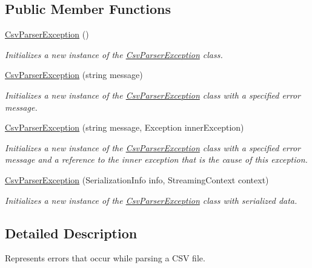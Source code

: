 \subsection*{Public Member Functions}
\begin{DoxyCompactItemize}
\item 
\hyperlink{a00047_a4a87a8cbca18790562bab5f571e6e87b}{Csv\-Parser\-Exception} ()
\begin{DoxyCompactList}\small\item\em Initializes a new instance of the \hyperlink{a00047}{Csv\-Parser\-Exception} class. \end{DoxyCompactList}\item 
\hyperlink{a00047_a6ac692a1b7bb39afc66a7c701963e9c2}{Csv\-Parser\-Exception} (string message)
\begin{DoxyCompactList}\small\item\em Initializes a new instance of the \hyperlink{a00047}{Csv\-Parser\-Exception} class with a specified error message. \end{DoxyCompactList}\item 
\hyperlink{a00047_a62b6bf7ba1ab79737a049a6ced4555d4}{Csv\-Parser\-Exception} (string message, Exception inner\-Exception)
\begin{DoxyCompactList}\small\item\em Initializes a new instance of the \hyperlink{a00047}{Csv\-Parser\-Exception} class with a specified error message and a reference to the inner exception that is the cause of this exception. \end{DoxyCompactList}\item 
\hyperlink{a00047_a3ce8a09ae6e88787d47f47a108d33f21}{Csv\-Parser\-Exception} (Serialization\-Info info, Streaming\-Context context)
\begin{DoxyCompactList}\small\item\em Initializes a new instance of the \hyperlink{a00047}{Csv\-Parser\-Exception} class with serialized data. \end{DoxyCompactList}\end{DoxyCompactItemize}


\subsection{Detailed Description}
Represents errors that occur while parsing a C\-S\-V file. 



